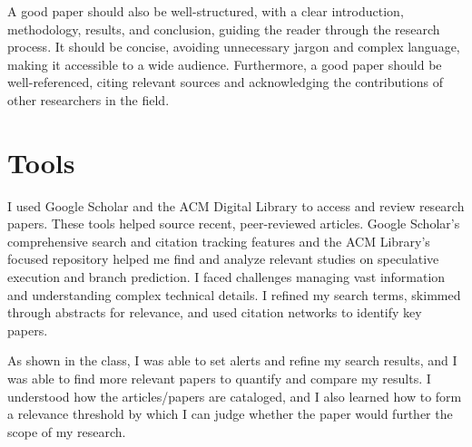 \documentclass{article}
\begin{document}
A good paper should also be well-structured, with a clear introduction, methodology, results, and conclusion, guiding the reader through the research process. It should be concise, avoiding unnecessary jargon and complex language, making it accessible to a wide audience. Furthermore, a good paper should be well-referenced, citing relevant sources and acknowledging the contributions of other researchers in the field.


\section{Tools}
I used Google Scholar and the ACM Digital Library to access and review research papers. These tools helped source recent, peer-reviewed articles. Google Scholar's comprehensive search and citation tracking features and the ACM Library's focused repository helped me find and analyze relevant studies on speculative execution and branch prediction. I faced challenges managing vast information and understanding complex technical details. I  refined my search terms, skimmed through abstracts for relevance, and used citation networks to identify key papers. 

As shown in the class, I was able to set alerts and refine my search results, and I was able to find more relevant papers to quantify and compare my results. I understood how the articles/papers are cataloged, and I also learned how to form a relevance threshold by which I can judge whether the paper would further the scope of my research. 



\end{document}
